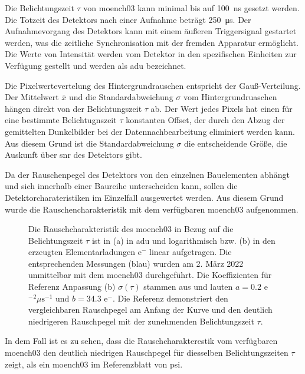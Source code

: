\noindent
Die Belichtungszeit $\tau$ von \gls{moench03} kann minimal bis auf \SI{100}{\nano\second} gesetzt werden. Die Totzeit des Detektors nach einer Aufnahme beträgt \SI{250}{\micro\second}. Der Aufnahmevorgang des Detektors kann mit einem äußeren Triggersignal gestartet werden, was die zeitliche Synchronisation mit der fremden Apparatur ermöglicht. Die Werte von Intensität werden vom Detektor in den spezifischen Einheiten zur Verfügung gestellt und werden als \gls{adu} bezeichnet.

\noindent
Die Pixelwertevertelung des Hintergrundrauschen entspricht der Gauß-Verteilung. Der Mittelwert $\bar{x}$ und die Standardabweichung $\sigma$ vom Hintergrundruaschen hängen direkt von der Belichtungszeit $\tau$ ab. Der Wert jedes Pixels hat einen für eine bestimmte Belichtugnszeit $\tau$ konstanten Offset, der durch den Abzug der gemittelten Dunkelbilder bei der Datennachbearbeitung eliminiert werden kann. Aus diesem Grund ist die Standardabweichung $\sigma$ die entscheidende Größe, die Auskunft über \gls{snr} des Detektors gibt.

\noindent
Da der Rauschenpegel des Detektors von den einzelnen Bauelementen abhängt und sich innerhalb einer Baureihe unterscheiden kann, sollen die  Detektorcharateristiken im Einzelfall ausgewertet werden. Aus diesem Grund wurde die Rauschencharakteristik mit dem verfügbaren \gls{moench03} aufgenommen.
\begin{figure}[H]
    \centering
    
    \caption{Die Rauschcharakteristik des \gls{moench03} in Bezug auf die Belichtungszeit $\tau$ ist in (a) in \gls{adu} und logarithmisch bzw. (b) in den erzeugten Elementarladungen e$^-$ linear aufgetragen. Die entsprechenden Messungen (blau) wurden am 2. März 2022 unmittelbar mit dem \gls{moench03} durchgeführt. Die Koeffizienten für Referenz Anpassung (b) $\sigma(\tau)$ stammen aus \cite{ramilli-measurements-2017} und lauten $a=\num{0,2}$ e${^-}^2\mu \text{s}^{-1}$ und $b=\num{34.3}$ e${^-}$. Die Referenz demonstriert den vergleichbaren Rauschpegel am Anfang der Kurve und den deutlich niedrigeren Rauschpegel mit der zunehmenden Belichtungszeit $\tau$.}
    \label{fig:noise_moench}
\end{figure}
\noindent
In dem Fall ist es zu sehen, dass die Rauschcharakterestik vom verfügbaren \gls{moench03} den deutlich niedrigen Rauschpegel für diesselben Belichtungszeiten $\tau$ zeigt, als ein \gls{moench03} im Referenzblatt \cite{ramilli-measurements-2017} von \gls{psi}.

